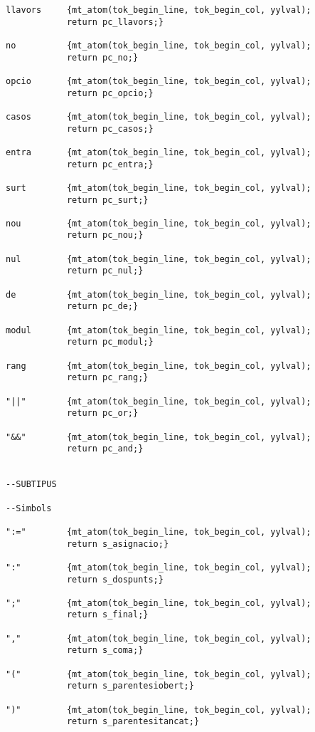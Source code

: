 \documentclass[10pt]{report}
\begin{document}
\begin{lstlisting}[style=Ada]
llavors     {mt_atom(tok_begin_line, tok_begin_col, yylval); 
            return pc_llavors;}

no          {mt_atom(tok_begin_line, tok_begin_col, yylval); 
            return pc_no;}

opcio       {mt_atom(tok_begin_line, tok_begin_col, yylval); 
            return pc_opcio;}

casos       {mt_atom(tok_begin_line, tok_begin_col, yylval); 
            return pc_casos;}

entra       {mt_atom(tok_begin_line, tok_begin_col, yylval); 
            return pc_entra;}

surt        {mt_atom(tok_begin_line, tok_begin_col, yylval); 
            return pc_surt;}

nou         {mt_atom(tok_begin_line, tok_begin_col, yylval); 
            return pc_nou;}

nul         {mt_atom(tok_begin_line, tok_begin_col, yylval); 
            return pc_nul;}

de          {mt_atom(tok_begin_line, tok_begin_col, yylval); 
            return pc_de;}

modul       {mt_atom(tok_begin_line, tok_begin_col, yylval); 
            return pc_modul;}

rang        {mt_atom(tok_begin_line, tok_begin_col, yylval); 
            return pc_rang;}

"||"        {mt_atom(tok_begin_line, tok_begin_col, yylval); 
            return pc_or;}

"&&"        {mt_atom(tok_begin_line, tok_begin_col, yylval); 
            return pc_and;}


--SUBTIPUS

--Simbols 

":="        {mt_atom(tok_begin_line, tok_begin_col, yylval); 
            return s_asignacio;}

":"         {mt_atom(tok_begin_line, tok_begin_col, yylval); 
            return s_dospunts;}

";"         {mt_atom(tok_begin_line, tok_begin_col, yylval); 
            return s_final;}

","         {mt_atom(tok_begin_line, tok_begin_col, yylval); 
            return s_coma;}

"("         {mt_atom(tok_begin_line, tok_begin_col, yylval);
            return s_parentesiobert;}

")"         {mt_atom(tok_begin_line, tok_begin_col, yylval);
            return s_parentesitancat;}


\end{lstlisting}
\end{document}
